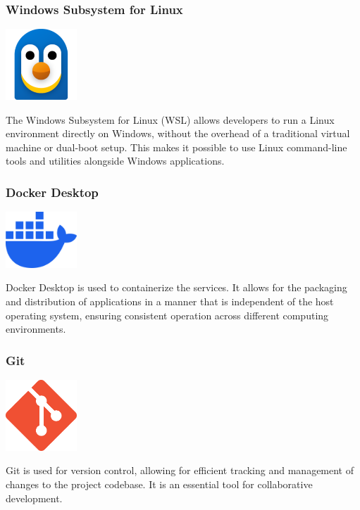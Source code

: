 \subsubsection{Windows Subsystem for Linux}
\begin{center}
\includegraphics[width=0.2\textwidth]{Images/logos/Windows_Subsystem_for_Linux_logo.png}
\label{fig:wsl}
\end{center}
The Windows Subsystem for Linux (WSL) allows developers to run a Linux environment directly on Windows, without the overhead of a traditional virtual machine or dual-boot setup. This makes it possible to use Linux command-line tools and utilities alongside Windows applications.

\subsubsection{Docker Desktop}
\begin{center}
\includegraphics[width=0.2\textwidth]{Images/logos/docker-mark-blue.png}
\label{fig:docker}
\end{center}
Docker Desktop is used to containerize the services. It allows for the packaging and distribution of applications in a manner that is independent of the host operating system, ensuring consistent operation across different computing environments.

\subsubsection{Git}
\begin{center}
\includegraphics[width=0.2\textwidth]{Images/logos/Git-Icon-1788C.png}
\label{fig:git}
\end{center}
Git is used for version control, allowing for efficient tracking and management of changes to the project codebase. It is an essential tool for collaborative development.

